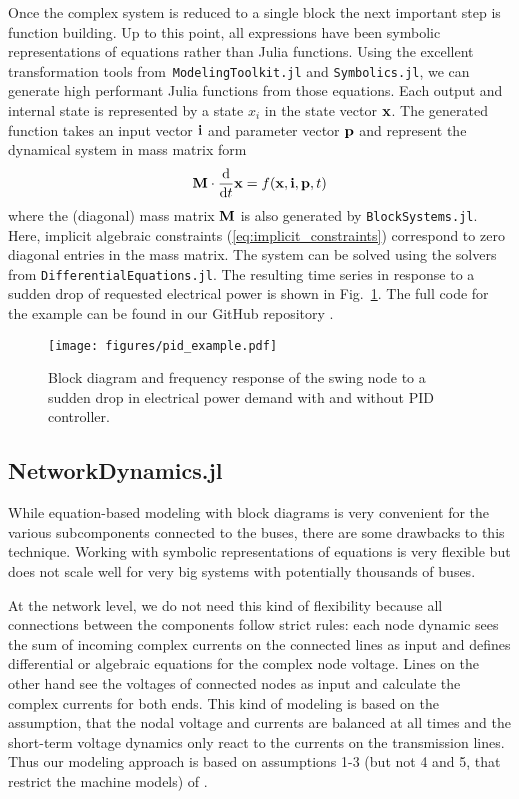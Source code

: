 \documentclass[conference]{IEEEtran}
\begin{document}
Once the complex system is reduced to a single block the next important step is function building.
Up to this point, all expressions have been symbolic representations of equations rather than Julia functions.
Using the excellent transformation tools from~\texttt{ModelingToolkit.jl} \cite{ma2021modelingtoolkit} and \texttt{Symbolics.jl}, we can generate high performant Julia functions from those equations. Each output and internal state is represented by a state $x_i$ in the state vector $\vb{x}$. The generated function takes an input vector $\vb{i}$ and parameter vector $\vb{p}$ and represent the dynamical system in mass matrix form
\begin{equation}
\vb{M}\cdot\dv{t}\vb{x} = f(\vb{x}, \vb{i}, \vb{p}, t)
\end{equation}
where the (diagonal) mass matrix $\vb{M}$ is also generated by \texttt{BlockSystems.jl}. Here, implicit algebraic constraints (\ref{eq:implicit_constraints}) correspond to zero diagonal entries in the mass matrix. The system can be solved using the solvers from \texttt{DifferentialEquations.jl}. The resulting time series in response to a sudden drop of requested electrical power is shown in Fig.~\ref{fig:pid_example}. The full code for the example can be found in our GitHub repository \cite{github_repo}.
\begin{figure}[h]
\centering
\scalebox{0.65}{}\vspace{0.2cm}
\texttt{[image: figures/pid\_example.pdf]}
  \caption{Block diagram and frequency response of the swing node to a sudden drop in electrical power demand with and without PID controller.}\label{fig:pid_example}
\end{figure}

\subsection{NetworkDynamics.jl}
While equation-based modeling with block diagrams is very convenient for the various subcomponents connected to the buses, there are some drawbacks to this technique. Working with symbolic representations of equations is very flexible but does not scale well for very big systems with potentially thousands of buses.

At the network level, we do not need this kind of flexibility because all connections between the components follow strict rules: each node dynamic sees the sum of incoming complex currents on the connected lines as input and defines differential or algebraic equations for the complex node voltage. Lines on the other hand see the voltages of connected nodes as input and calculate the complex currents for both ends.
This kind of modeling is based on the assumption, that the nodal voltage and currents are balanced at all times and the short-term voltage dynamics only react to the currents on the transmission lines. Thus our modeling approach is based on assumptions 1-3 (but not 4 and 5, that restrict the machine models) of \cite{kogler2021normal}.
\end{document}
